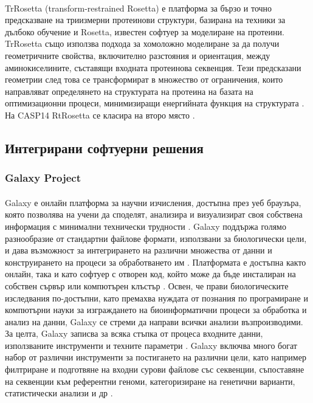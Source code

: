 \documentclass[pdftex,cyrillic,14pt,a4page,twoside,openright]{extreport}
\begin{document}
\paragraph{}
TrRosetta (transform-restrained Rosetta) е платформа за бързо и точно предсказване на триизмерни протеинови структури, базирана на техники за дълбоко обучение и Rosetta, известен софтуер за моделиране на протеини. TrRosetta също използва подхода за хомоложно моделиране за да получи геометричните свойства, включително разстояния и ориентация, между аминокиселините, съставящи входната протеинова секвенция. Тези предсказани геометрии след това се трансформират в множество от ограничения, които направляват определянето на структурата на протеина на базата на оптимизационни процеси, минимизиращи енергийната функция на структурата \cite{du2021}. На CASP14 RtRosetta се класира на второ място \cite{pereira2021}. 

\subsection{Интегрирани софтуерни решения}

\subsubsection{Galaxy Project}
\paragraph{}
Galaxy е онлайн платформа за научни изчисления, достъпна през уеб браузъра, която позволява на учени да споделят, анализира и визуализират своя собствена информация с минимални технически трудности \cite{galaxy2022}. Galaxy поддържа голямо разнообразие от стандартни файлове формати, използвани за биологически цели, и дава възможност за интегрирането на различни множества от данни и конструирането на процеси за обработването им \cite{blankenberg2011}. Платформата е достъпна както онлайн, така и като софтуер с отворен код, който може да бъде инсталиран на собствен сървър или компютърен клъстър \cite{nekrutenko2010}. Освен, че прави биологическите изследвания по-достъпни, като премахва нуждата от познания по програмиране и компютърни науки за изграждането на биоинформатични процеси за обработка и анализ на данни, Galaxy се стреми да направи всички анализи възпроизводими. За целта, Galaxy записва за всяка стъпка от процеса входните данни, използваните инструменти и техните параметри \cite{schatz2010}. Galaxy включва много богат набор от различни инструменти за постигането на различни цели, като например филтриране и подготвяне на входни сурови файлове със секвенции, съпоставяне на секвенции към референтни геноми, категоризиране на генетични варианти, статистически анализи и др \cite{schatz2010}.
\end{document}
